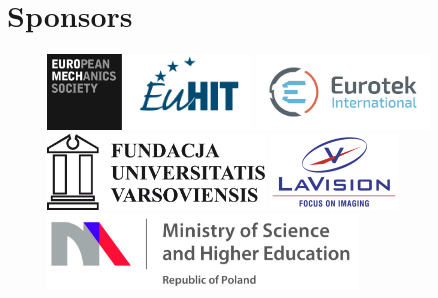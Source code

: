 \section*{Sponsors}
\begin{figure}[H]%
	\centering
	\includegraphics[height=2cm,keepaspectratio]{logo_spons/logoEUROMECH}\hfill
	\includegraphics[height=2cm,keepaspectratio]{logo_spons/EuHIT+logo+navy}\hfill
	\includegraphics[height=2cm,keepaspectratio]{logo_spons/logo_Eurotec_kolor}\hfill
	\includegraphics[height=2cm,keepaspectratio]{logo_spons/UV_logo}\hfill
	\vspace{.5cm}
	\includegraphics[height=2cm,keepaspectratio]{logo_spons/La_vision_logo}
	\hspace{.5cm}%
	\includegraphics[height=2cm,keepaspectratio]{logo_spons/Ministry_logo}
\end{figure}

